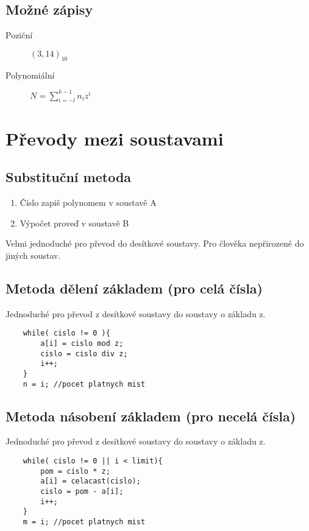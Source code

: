 \documentclass[a4paper, 11pt]{report}
\begin{document}
\subsection{Možné zápisy}
\begin{description}
	\item[Poziční] $(3,14)_{10}$
	\item[Polynomiální] $N =  \sum_{i=-l}^{k-1} n_i z^i$
\end{description}

\section{Převody mezi soustavami}

\subsection{Substituční metoda}

\begin{enumerate}
	\item Číslo zapiš polynomem  v soustavě A
	\item Výpočet proveď v soustavě B
\end{enumerate}


Velmi jednoduché pro převod do desítkové soustavy. Pro člověka nepřirozené do jiných soustav.

\subsection{Metoda dělení základem (pro celá čísla)}

Jednoduché pro převod z desítkové soustavy do soustavy o základu z.

\begin{lstlisting}
	while( cislo != 0 ){
		a[i] = cislo mod z;
		cislo = cislo div z;
		i++;
	}
	n = i; //pocet platnych mist
\end{lstlisting}

\subsection{Metoda násobení základem (pro necelá čísla)}

Jednoduché pro převod z desítkové soustavy do soustavy o základu z.

\begin{lstlisting}
	while( cislo != 0 || i < limit){
		pom = cislo * z;
		a[i] = celacast(cislo);
		cislo = pom - a[i];
		i++;
	}
	m = i; //pocet platnych mist
\end{lstlisting}
\end{document}
